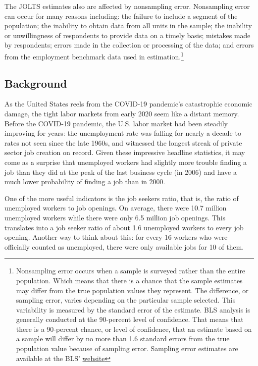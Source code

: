 \documentclass[
  11pt,
]{article}
\begin{document}
The JOLTS estimates also are affected by nonsampling error. Nonsampling
error can occur for many reasons including: the failure to include a
segment of the population; the inability to obtain data from all units
in the sample; the inability or unwillingness of respondents to provide
data on a timely basis; mistakes made by respondents; errors made in the
collection or processing of the data; and errors from the employment
benchmark data used in estimation.\footnote{Nonsampling error occurs
  when a sample is surveyed rather than the entire population. Which
  means that there is a chance that the sample estimates may differ from
  the true population values they represent. The difference, or sampling
  error, varies depending on the particular sample selected. This
  variability is measured by the standard error of the estimate. BLS
  analysis is generally conducted at the 90-percent level of confidence.
  That means that there is a 90-percent chance, or level of confidence,
  that an estimate based on a sample will differ by no more than 1.6
  standard errors from the true population value because of sampling
  error. Sampling error estimates are available at the BLS'
  \href{https://www.bls.gov/jlt/jolts_median_standard_errors.htm}{website}}

\hypertarget{background}{%
\subsection{Background}\label{background}}

As the United States reels from the COVID-19 pandemic's catastrophic
economic damage, the tight labor markets from early 2020 seem like a
distant memory. Before the COVID-19 pandemic, the U.S. labor market had
been steadily improving for years: the unemployment rate was falling for
nearly a decade to rates not seen since the late 1960s, and witnessed
the longest streak of private sector job creation on record. Given these
impressive headline statistics, it may come as a surprise that
unemployed workers had slightly more trouble finding a job than they did
at the peak of the last business cycle (in 2006) and have a much lower
probability of finding a job than in 2000.

One of the more useful indicators is the job seekers ratio, that is, the
ratio of unemployed workers to job openings. On average, there were 10.7
million unemployed workers while there were only 6.5 million job
openings. This translates into a job seeker ratio of about 1.6
unemployed workers to every job opening. Another way to think about
this: for every 16 workers who were officially counted as unemployed,
there were only available jobs for 10 of them.
\end{document}
